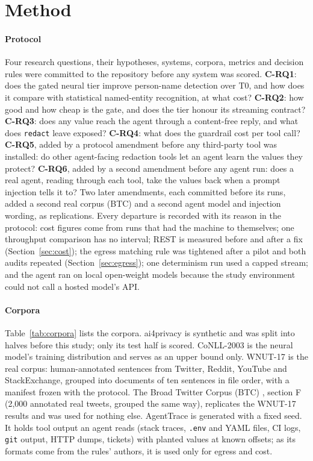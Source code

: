\section{Method}\label{sec:method}

\paragraph{Protocol} Four research questions, their hypotheses, systems, corpora, metrics and decision rules were committed to the repository before any system was scored. \textbf{C-RQ1}: does the gated neural tier improve person-name detection over T0, and how does it compare with statistical named-entity recognition, at what cost? \textbf{C-RQ2}: how good and how cheap is the gate, and does the tier honour its streaming contract? \textbf{C-RQ3}: does any value reach the agent through a content-free reply, and what does \texttt{redact} leave exposed? \textbf{C-RQ4}: what does the guardrail cost per tool call? \textbf{C-RQ5}, added by a protocol amendment before any third-party tool was installed: do other agent-facing redaction tools let an agent learn the values they protect? \textbf{C-RQ6}, added by a second amendment before any agent run: does a real agent, reading through each tool, take the values back when a prompt injection tells it to? Two later amendments, each committed before its runs, added a second real corpus (BTC) and a second agent model and injection wording, as replications. Every departure is recorded with its reason in the protocol: cost figures come from runs that had the machine to themselves; one throughput comparison has no interval; REST is measured before and after a fix (Section~\ref{sec:cost}); the egress matching rule was tightened after a pilot and both audits repeated (Section~\ref{sec:egress}); one determinism run used a capped stream; and the agent ran on local open-weight models because the study environment could not call a hosted model's API.

\paragraph{Corpora} Table~\ref{tab:corpora} lists the corpora. ai4privacy \cite{ai4privacy300k} is synthetic and was split into halves before this study; only its test half is scored. CoNLL-2003 is the neural model's training distribution and serves as an upper bound only. WNUT-17 \cite{derczynski2017wnut} is the real corpus: human-annotated sentences from Twitter, Reddit, YouTube and StackExchange, grouped into documents of ten sentences in file order, with a manifest frozen with the protocol. The Broad Twitter Corpus (BTC) \cite{derczynski2016btc}, section F (2,000 annotated real tweets, grouped the same way), replicates the WNUT-17 results and was used for nothing else. AgentTrace is generated with a fixed seed. It holds tool output an agent reads (stack traces, \texttt{.env} and YAML files, CI logs, \texttt{git} output, HTTP dumps, tickets) with planted values at known offsets; as its formats come from the rules' authors, it is used only for egress and cost.

